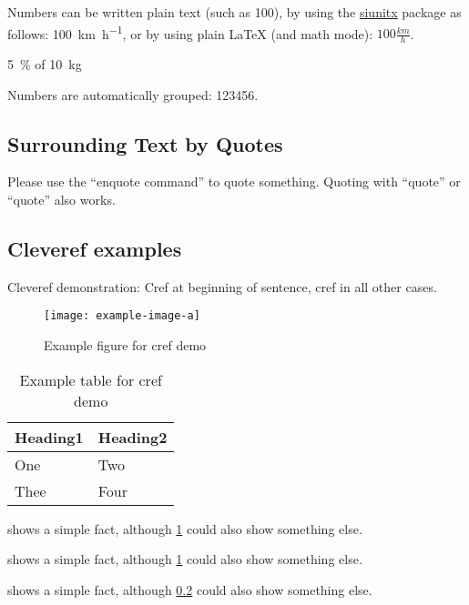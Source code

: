 \documentclass[sigconf,balance]{acmart}
\begin{document}
\begin{ltgexample}
Numbers can be written plain text (such as 100), by using the \href{https://ctan.org/pkg/siunitx}{siunitx} package as follows:
\SI{100}{\km\per\hour},
or by using plain \LaTeX{} (and math mode):
$100 \frac{\mathit{km}}{h}$.
\end{ltgexample}

\begin{ltgexample}
\SI{5}{\percent} of \SI{10}{kg}
\end{ltgexample}

\begin{ltgexample}
Numbers are automatically grouped: \num{123456}.
\end{ltgexample}

\subsection{Surrounding Text by Quotes}

\begin{ltgexample}
Please use the \enquote{enquote command} to quote something.
Quoting with "`quote"' or ``quote'' also works.

\end{ltgexample}

\subsection{Cleveref examples}
\label{sec:ex:cref}

Cleveref demonstration: Cref at beginning of sentence, cref in all other cases.

\begin{figure}
  \centering
  \texttt{[image: example-image-a]}
  \caption{Example figure for cref demo}
  \label{fig:ex:cref}
\end{figure}

\begin{table}
  \centering
  \begin{tabular}{ll}
    \toprule
    Heading1 & Heading2 \\
    \midrule
    One      & Two      \\
    Thee     & Four     \\
    \bottomrule
  \end{tabular}
  \caption{Example table for cref demo}
  \label{tab:ex:cref}
\end{table}

\begin{ltgexample}
 shows a simple fact, although \cref{fig:ex:cref} could also show something else.

 shows a simple fact, although \cref{tab:ex:cref} could also show something else.

 shows a simple fact, although \cref{sec:ex:cref} could also show something else.
\end{ltgexample}
\end{document}

